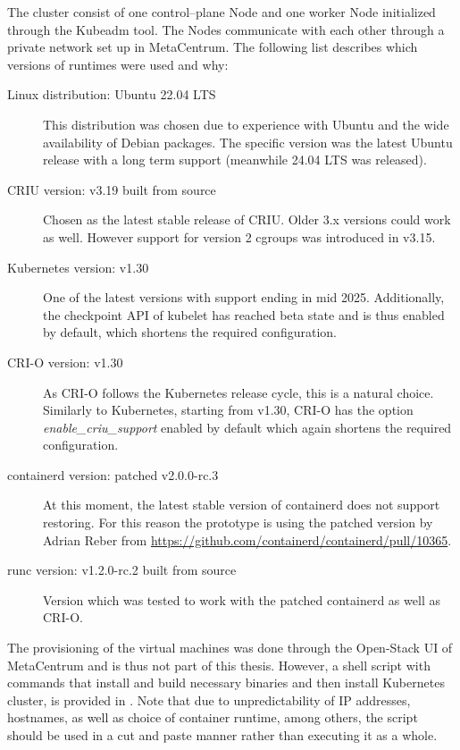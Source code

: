 \documentclass[
  digital,     %
  oneside,     %
  nosansbold,  %
  nocolorbold, %
  lof,         %
  lot,         %
]{fithesis4}
\begin{document}
The cluster consist of one control--plane Node and one worker Node initialized through the Kubeadm tool. The Nodes communicate with each other through a private network set up in MetaCentrum. The following list describes which versions of runtimes were used and why:

\begin{description}
    \item[Linux distribution: Ubuntu 22.04 LTS] This distribution was chosen due to experience with Ubuntu and the wide availability of Debian packages. The specific version was the latest Ubuntu release with a long term support (meanwhile 24.04 LTS was released).
    
    \item[CRIU version: v3.19 built from source] Chosen as the latest stable release of CRIU. Older 3.x versions could work as well. However support for version 2 cgroups was introduced in v3.15.
    
    \item[Kubernetes version: v1.30] One of the latest versions with support ending in mid 2025. Additionally, the checkpoint API of kubelet has reached beta state and is thus enabled by default, which shortens the required configuration.

    \item[CRI-O version: v1.30] As CRI-O follows the Kubernetes release cycle, this is a natural choice. Similarly to Kubernetes, starting from v1.30, CRI-O has the option \emph{enable\_criu\_support} enabled by default which again shortens the required configuration.
        
    \item[containerd version: patched v2.0.0-rc.3] At this moment, the latest stable version of containerd does not support restoring. For this reason the prototype is using the patched version by Adrian Reber from \url{https://github.com/containerd/containerd/pull/10365}.

    \item[runc version: v1.2.0-rc.2 built from source] Version which was tested to work with the patched containerd as well as CRI-O. %

\end{description}

The provisioning of the virtual machines was done through the Open-Stack UI of MetaCentrum and is thus not part of this thesis. However, a shell script with commands that install and build necessary binaries and then install Kubernetes cluster, is provided in . Note that due to unpredictability of IP addresses, hostnames, as well as choice of container runtime, among others, the script should be used in a cut and paste manner rather than executing it as a whole.
\end{document}
